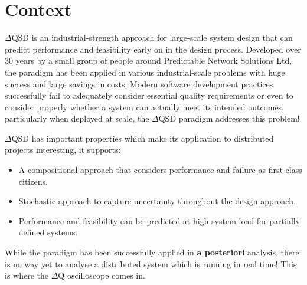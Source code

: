 \section{Context}
    $\Delta$QSD is an industrial-strength approach for large-scale system design that can predict performance and feasibility early on in the design process.  
    Developed over 30 years by a small group of people around Predictable Network Solutions Ltd, the paradigm has been applied in various industrial-scale problems with huge success and large savings in costs. \cite{dq-tut}
    Modern software development practices successfully fail to adequately consider essential quality requirements or even to consider properly whether a system can actually meet its intended outcomes, particularly when deployed at scale, the $\Delta$QSD paradigm addresses this problem! 

       $\Delta$QSD has important properties which make its application to distributed projects interesting, it supports:
    \begin{itemize}
        \item A compositional approach that considers performance and failure as first-class citizens. 
        \item Stochastic approach to capture uncertainty throughout the design approach.
        \item Performance and feasibility can be predicted at high system load for partially defined systems.
    \end{itemize}
    
    While the paradigm has been successfully applied in \textbf{a posteriori} analysis, there is no way yet to analyse a distributed system which is running in real time! This is where the $\Delta$Q oscilloscope comes in. 
